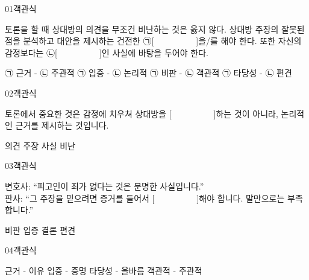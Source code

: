 \documentclass[fs95,seriesFre]{korfarm-base}
\begin{document}
\begin{kfQBlock}{01}{객관식}
\begin{kfEvidence}토론을 할 때 상대방의 의견을 무조건 비난하는 것은 옳지 않다. 상대방 주장의 잘못된 점을 분석하고 대안을 제시하는 건전한 ㉠[　　　　　]을/를 해야 한다. 또한 자신의 감정보다는 ㉡[　　　　　]인 사실에 바탕을 두어야 한다.\end{kfEvidence}
\begin{kfChoices}
\kfChoice ㉠ 근거 - ㉡ 주관적
\kfChoice ㉠ 입증 - ㉡ 논리적
\kfChoice ㉠ 비판 - ㉡ 객관적
\kfChoice ㉠ 타당성 - ㉡ 편견
\end{kfChoices}
\end{kfQBlock}

\begin{kfQBlock}{02}{객관식}
\begin{kfEvidence}토론에서 중요한 것은 감정에 치우쳐 상대방을 [　　　　　]하는 것이 아니라, 논리적인 근거를 제시하는 것입니다.\end{kfEvidence}
\begin{kfChoices}
\kfChoice 의견
\kfChoice 주장
\kfChoice 사실
\kfChoice 비난
\end{kfChoices}
\end{kfQBlock}

\begin{kfQBlock}{03}{객관식}
\begin{kfEvidence}변호사: “피고인이 죄가 없다는 것은 분명한 사실입니다.” \\\relax
판사: “그 주장을 믿으려면 증거를 들어서 [　　　　　]해야 합니다. 말만으로는 부족합니다.”\end{kfEvidence}
\begin{kfChoices}
\kfChoice 비판
\kfChoice 입증
\kfChoice 결론
\kfChoice 편견
\end{kfChoices}
\end{kfQBlock}

\begin{kfQBlock}{04}{객관식}
\begin{kfChoices}
\kfChoice 근거 - 이유
\kfChoice 입증 - 증명
\kfChoice 타당성 - 올바름
\kfChoice 객관적 - 주관적
\end{kfChoices}
\end{kfQBlock}
\end{document}
